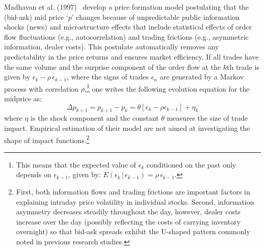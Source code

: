 Madhavan et al. (1997)~\cite{madhaven1997} develop a price formation model postulating that the (bid-ask) mid price `$p$' changes because of unpredictable public information shocks (news) and microstructure effects that include statistical effects of order flow fluctuations (e.g., autocorrelation) and trading frictions (e.g., asymmetric information, dealer costs). This postulate automatically removes any predictability in the price returns and ensures market efficiency. If all trades have the same volume and the surprise component of the order flow at the $k$th trade is given by $\epsilon_k - \rho \,\epsilon_{k-1}$, where the signs of trades $\epsilon_n$ are generated by a Markov process with correlation $\rho$,\footnote{This means that the expected value of $\epsilon_k$ conditioned on the past only depends on $\epsilon_{k-1}$, given by: $E(\epsilon_k\,|\,\epsilon_{k-1})=\rho\,\epsilon_{k-1}$.}  one writes the following evolution equation for the midprice as:
	\begin{equation}\label{eqn:midpointdelta}
	\Delta p_{k+1}=p_{k+1}-p_k=\theta[\epsilon_k - \rho \epsilon_{k-1}]+\eta_k
	\end{equation}
where $\eta$ is the shock component and the constant $\theta$ measures the size of trade impact. Empirical estimation of their model are not aimed at investigating the shape of impact functions.\footnote{First, both information flows and trading frictions are important factors in explaining intraday price volatility in individual stocks. Second, information asymmetry decreases steadily throughout the day, however, dealer costs increase over the day (possibly reflecting the costs of carrying inventory overnight) so that bid-ask spreads exhibit the U-shaped pattern commonly noted in previous research studies.}



